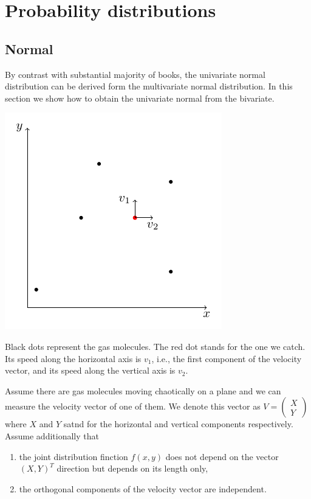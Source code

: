 \section{Probability distributions}

\subsection{Normal}

By contrast with substantial majority of books, the univariate normal distribution
can be derived form the multivariate normal distribution.
In this section we show how to obtain the univariate normal from the bivariate.

\begin{marginfigure}
  \includegraphics[width=\linewidth]{figures/04_normal.pdf}
  \caption{Black dots represent the gas molecules.
  The red dot stands for the one we catch.
  Its speed along the horizontal axis is $v_1$, i.e., the first component of
  the velocity vector, and its speed along the vertical axis is $v_2$.}
\end{marginfigure}

Assume there are gas molecules moving chaotically on a plane
and we can measure the velocity vector of one of them.
We denote this vector as $V = \begin{pmatrix} X \\ Y \end{pmatrix}$
where $X$ and $Y$ satnd for the horizontal and vertical components respectively.
Assume additionally that
\begin{enumerate}
  \item the joint distribution finction $f(x,y)$ does not depend on
  the vector $(X,Y)^T$ direction but depends on its length only,
  \item the orthogonal components of the velocity vector are independent.
\end{enumerate}

